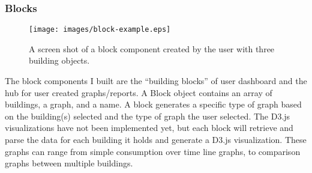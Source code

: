 \documentclass[letterpaper,10pt,serif,draftclsnofoot,onecolumn,compsoc,titlepage]{IEEEtran}
\begin{document}
\subsubsection{Blocks}
\begin{figure}[H]
  \centering
  \texttt{[image: images/block-example.eps]}
  \caption{A screen shot of a block component created by the user with three building objects.}
\end{figure}
The block components I built are the ``building blocks'' of user dashboard and the hub for user created graphs/reports. A Block object contains an array of buildings, a graph, and a name. A block generates a specific type of graph based on the building(s) selected and the type of graph the user selected. The D3.js visualizations have not been implemented yet, but each block will retrieve and parse the data for each building it holds and generate a D3.js visualization. These graphs can range from simple consumption over time line graphs, to comparison graphs between multiple buildings.\\
\end{document}

